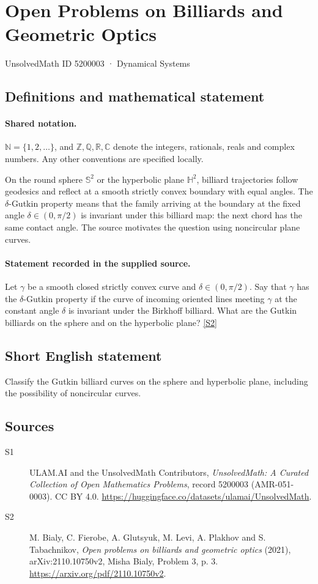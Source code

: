 \documentclass[11pt]{article}
\newcommand{\sref}[2]{\hyperlink{source:#1:#2}{[S#2]}}
\begin{document}
\setcounter{section}{5200002}
\section{Open Problems on Billiards and Geometric Optics}\label{5200003}
{\small\sffamily UnsolvedMath ID 5200003 · Dynamical Systems}
\subsection{Definitions and mathematical statement}

\paragraph{Shared notation.}$\mathbb N=\{1,2,\ldots\}$, and $\mathbb Z,\mathbb Q,\mathbb R,\mathbb C$ denote the integers, rationals, reals and complex numbers. Any other conventions are specified locally.


On the round sphere $\mathbb S^2$ or the hyperbolic plane $\mathbb H^2$, billiard trajectories follow geodesics and reflect at a smooth strictly convex boundary with equal angles. The $\delta$-Gutkin property means that the family arriving at the boundary at the fixed angle $\delta\in(0,\pi/2)$ is invariant under this billiard map: the next chord has the same contact angle. The source motivates the question using noncircular plane curves.
\paragraph{Statement recorded in the supplied source.}
Let $\gamma$ be a smooth closed strictly convex curve and $\delta\in(0,\pi/2)$. Say that $\gamma$ has the $\delta$-Gutkin property if the curve of incoming oriented lines meeting $\gamma$ at the constant angle $\delta$ is invariant under the Birkhoff billiard. What are the Gutkin billiards on the sphere and on the hyperbolic plane? \sref{5200003}{2}
\subsection{Short English statement}
Classify the Gutkin billiard curves on the sphere and hyperbolic plane, including the possibility of noncircular curves.
\subsection{Sources}
\begin{description}
\item[\hypertarget{source:5200003:1}{S1}] ULAM.AI and the UnsolvedMath Contributors, \emph{UnsolvedMath: A Curated Collection of Open Mathematics Problems}, record 5200003 (AMR-051-0003). CC BY 4.0. \url{https://huggingface.co/datasets/ulamai/UnsolvedMath}.
\item[\hypertarget{source:5200003:2}{S2}] M. Bialy, C. Fierobe, A. Glutsyuk, M. Levi, A. Plakhov and S. Tabachnikov, \emph{Open problems on billiards and geometric optics} (2021), arXiv:2110.10750v2, Misha Bialy, Problem 3, p. 3. \url{https://arxiv.org/pdf/2110.10750v2}.
\end{description}
\label{end:5200003}
\end{document}
